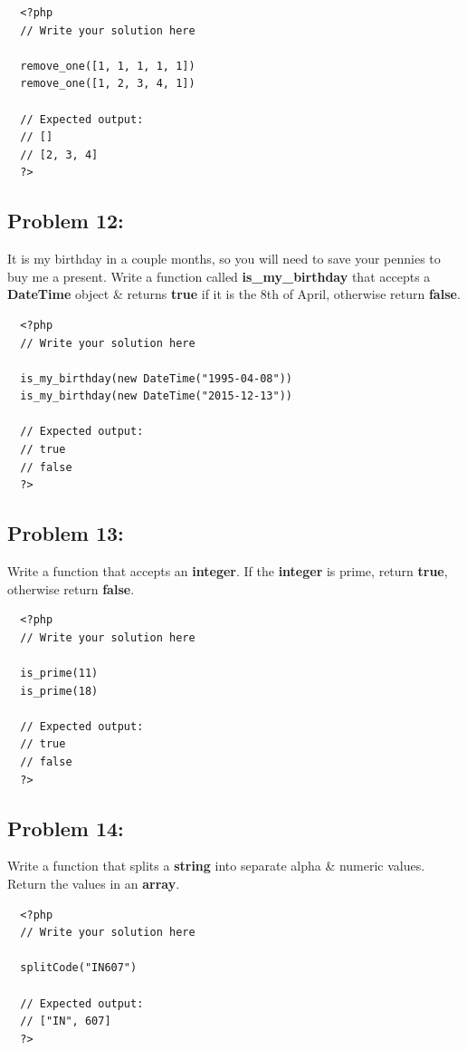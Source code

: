 \documentclass{article}
\begin{document}
\begin{verbatim}
  <?php  
  // Write your solution here

  remove_one([1, 1, 1, 1, 1])
  remove_one([1, 2, 3, 4, 1])

  // Expected output:
  // []
  // [2, 3, 4]
  ?>
\end{verbatim}

\subsection*{Problem 12:}
It is my birthday in a couple months, so you will need to save your pennies to buy me a present. Write a function called \textbf{is\_my\_birthday} that accepts a \textbf{DateTime} object \& returns \textbf{true} if it is the 8th of April, otherwise return \textbf{false}.

\begin{verbatim}
  <?php  
  // Write your solution here

  is_my_birthday(new DateTime("1995-04-08"))
  is_my_birthday(new DateTime("2015-12-13"))

  // Expected output:
  // true
  // false
  ?>
\end{verbatim}

\subsection*{Problem 13:}

Write a function that accepts an \textbf{integer}. If the \textbf{integer} is prime, return \textbf{true}, otherwise return \textbf{false}. 

\begin{verbatim}
  <?php  
  // Write your solution here

  is_prime(11)
  is_prime(18)

  // Expected output:
  // true
  // false
  ?>
\end{verbatim}

\subsection*{Problem 14:}
Write a function that splits a \textbf{string} into separate alpha \& numeric values. Return the values in an \textbf{array}.

\begin{verbatim}
  <?php  
  // Write your solution here

  splitCode("IN607")

  // Expected output: 
  // ["IN", 607]
  ?>
\end{verbatim} 
\end{document}

